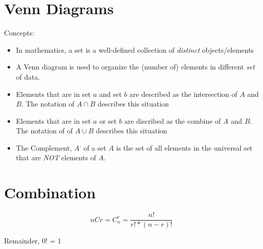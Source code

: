 \section{Venn Diagrams}
Concepts:
\begin{itemize}
    \item In mathematics, a set is a well-defined collection of \textit{distinct} objects/elements
    \item A Venn diagram is used to organize the (number of) elements in different \textit{set} of data.
    \item Elements that are in set $a$ and set $b$ are described as the intersection of $A$ and $B$. The notation of $A \cap B$ describes this situation
    \item Elements that are in set $a$ or set $b$ are discribed as the combine of $A$ and $B$. The notation of of $A\cup B$ describes this situation
    \item The Complement, $A^{,}$ of a set $A$ is the set of all elements in the universal set that are \textit{NOT} elements of $A$.
\end{itemize}

\section{Combination}
\[
    nCr = C_{n}^r = \frac{n!}{r! * (n - r)!}
\]
\begin{center}
    Remainder, $0!$ = \textbf{$1$}
\end{center}

